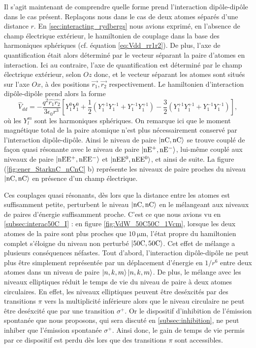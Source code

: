 Il s'agit maintenant de comprendre quelle forme prend l'interaction dipôle-dipôle dans le cas présent.
Replaçons nous dans le cas de deux atomes séparés d'une distance $r$.
En \ref{sec:interacting_rydbergs} nous avions exprimé, en l'absence de champ électrique extérieur, le hamiltonien de couplage dans la base des harmoniques sphériques (cf. équation \eqref{eq:Vdd_rr1r2}).
De plus, l'axe de quantification était alors déterminé par le vecteur séparant la paire d'atomes en interaction.
Ici au contraire, l'axe de quantification est déterminé par le champ électrique extérieur, selon $Oz$ donc, et le vecteur séparant les atomes sont situés sur l'axe $Ox$, à des positions $\vec{r_1},\vec{r_2}$ respectivement.
Le hamiltonien d'interaction dipôle-dipôle prend alors la forme
\begin{equation}
\label{eq:dipdip_nC}
\hat{V}_{dd} = -\frac{q^2\hat{r_1} \hat{r_2}}{3\epsilon_0 r^3}
\left[ Y_1^0 Y_1^0 + \frac{1}{2} \left( Y_1^{+1}Y_1^{-1} + Y_1^{-1}Y_1^{+1} \right)
- \frac{3}{2} \left(  Y_1^{+1}Y_1^{+1} + Y_1^{-1}Y_1^{-1} \right) \right],
\end{equation}
où les $Y_l^m$ sont les harmoniques sphériques.
On remarque ici que le moment magnétique total de la paire atomique n'est plus nécessairement conservé par l'interaction dipôle-dipôle.
Ainsi le niveau de paire $\ket{\mathrm{nC},\mathrm{nC}}$ se trouve couplé de façon quasi résonante avec le niveau de paire $\ket{\mathrm{nE^+},\mathrm{nE^-}}$, lui-même couplé aux niveaux de paire $\ket{\mathrm{nEE^+},\mathrm{nEE^-}}$ et $\ket{\mathrm{nEE^0},\mathrm{nEE^0}}$, et ainsi de suite.
La figure (\ref{fig:ener_StarknC_nCnC} b) représente les niveaux de paire proches du niveau $\ket{\mathrm{nC},\mathrm{nC}}$ en présence d'un champ électrique.

Ces couplages quasi résonants, dès lors que la distance entre les atomes est suffisamment petite, perturbent le niveau $\ket{\mathrm{nC,nC}}$ en le mélangeant aux niveaux de paires d'énergie suffisamment proche.
C'est ce que nous avions vu en \ref{subsec:interac50C_I} : en figure \eqref{fig:VdW_50C50C_1Vcm}, lorsque les deux atomes de la paire sont plus proches que $\SI{10}{\um}$, l'état propre du hamiltonien complet s'éloigne du niveau non perturbé $\ket{\mathrm{50C,50C}}$.
Cet effet de mélange a plusieurs conséquences néfastes.
Tout d'abord, l'interaction dipôle-dipôle ne peut plus être simplement représentée par un déplacement d'énergie en $1/r^6$ entre deux atomes dans un niveau de paire $\ket{n,k,m}\ket{n,k,m}$.
De plus, le mélange avec les niveaux elliptiques réduit le temps de vie du niveau de paire à deux atomes circulaires.
En effet, les niveaux elliptiques peuvent être deséxcités par des transitions $\pi$ vers la multiplicité inférieure alors que le niveau circulaire ne peut être deséxcité que par une transition $\sigma^+$.
Or le dispositif d'inhibition de l'émission spontanée que nous proposons, qui sera discuté en \ref{subsec:inhibition}, ne peut inhiber que l'émission spontanée $\sigma^+$.
Ainsi donc, le gain de temps de vie permis par ce dispositif est perdu dès lors que des transitions $\pi$ sont accessibles.

